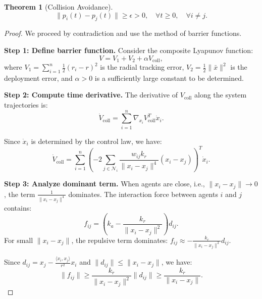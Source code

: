 \documentclass{ctexart}
\newtheorem{theorem}{Theorem}[section]
\begin{document}
\begin{theorem}[Collision Avoidance]
\begin{equation}
\|p_i(t) - p_j(t)\| \geq \epsilon > 0, \quad \forall t \geq 0, \quad \forall i \neq j.
\end{equation}
\end{theorem}

\begin{proof}
We proceed by contradiction and use the method of barrier functions.

\textbf{Step 1: Define barrier function.}
Consider the composite Lyapunov function:
\begin{equation}
V = V_1 + V_2 + \alpha V_{\text{coll}},
\end{equation}
where $V_1 = \sum_{i=1}^{n} \frac{1}{2}(r_i - r)^2$ is the radial tracking error, $V_2 = \frac{1}{2} \|\bar{x}\|^2$ is the deployment error, and $\alpha > 0$ is a sufficiently large constant to be determined.

\textbf{Step 2: Compute time derivative.}
The derivative of $V_{\text{coll}}$ along the system trajectories is:
\begin{equation}
\dot{V}_{\text{coll}} = \sum_{i=1}^{n} \nabla_{x_i} V_{\text{coll}}^T \dot{x}_i.
\end{equation}

Since $\dot{x}_i$ is determined by the control law, we have:
\begin{equation}
\dot{V}_{\text{coll}} = \sum_{i=1}^{n} \left( -2 \sum_{j \in \mathcal{N}_i} \frac{w_{ij} k_r}{\|x_i - x_j\|^4} (x_i - x_j) \right)^T \dot{x}_i.
\end{equation}

\textbf{Step 3: Analyze dominant term.}
When agents are close, i.e., $\|x_i - x_j\| \to 0$, the term $\frac{1}{\|x_i - x_j\|^4}$ dominates.
The interaction force between agents $i$ and $j$ contains:
\begin{equation}
f_{ij} = \left(k_a - \frac{k_r}{\|x_i - x_j\|^2}\right) d_{ij}.
\end{equation}
For small $\|x_i - x_j\|$, the repulsive term dominates: $f_{ij} \approx -\frac{k_r}{\|x_i - x_j\|^2} d_{ij}$.

Since $d_{ij} = x_j - \frac{\langle x_i, x_j \rangle}{r^2} x_i$ and $\|d_{ij}\| \leq \|x_i - x_j\|$, we have:
\begin{equation}
\|f_{ij}\| \geq \frac{k_r}{\|x_i - x_j\|^2} \|d_{ij}\| \geq \frac{k_r}{\|x_i - x_j\|}.
\end{equation}


\end{proof}
\end{document}
